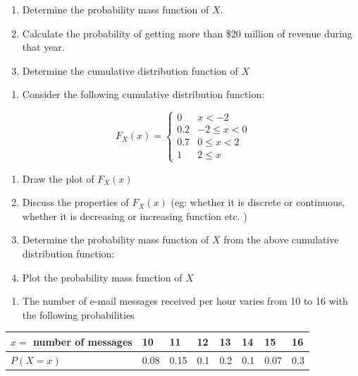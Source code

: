 \documentclass[]{book}
\providecommand{\tightlist}{%
  \setlength{\itemsep}{0pt}\setlength{\parskip}{0pt}}
\begin{document}
\begin{enumerate}
\def\labelenumi{(\alph{enumi})}
\tightlist
\item
  Determine the probability mass function of \(X\).
\item
  Calculate the probability of getting more than \$20 million of revenue during that year.\\
\item
  Determine the cumulative distribution function of \(X\)
\end{enumerate}

\begin{enumerate}
\def\labelenumi{\arabic{enumi}.}
\setcounter{enumi}{5}
\tightlist
\item
  Consider the following cumulative distribution function:
\end{enumerate}

\begin{equation}
F_X(x) =
\begin{cases} 
0 & x<-2\\
0.2 & -2 \leq x< 0\\
0.7 & 0\leq x<2\\
1 & 2 \leq x
\end{cases}
\end{equation}

\begin{enumerate}
\def\labelenumi{\alph{enumi})}
\tightlist
\item
  Draw the plot of \(F_X(x)\)
\item
  Discuss the properties of \(F_X(x)\) (eg: whether it is discrete or continuous, whether it is decreasing or increasing function etc. )
\item
  Determine the probability mass function of \(X\) from the above cumulative distribution function:
\item
  Plot the probability mass function of \(X\)
\end{enumerate}

\begin{enumerate}
\def\labelenumi{\arabic{enumi}.}
\setcounter{enumi}{6}
\tightlist
\item
  The number of e-mail messages received per hour varies from 10 to 16 with the following probabilities
\end{enumerate}

\begin{longtable}[]{@{}llllllll@{}}
\toprule
\(x =\) number of messages & 10 & 11 & 12 & 13 & 14 & 15 & 16\tabularnewline
\midrule
\endhead
\(P(X=x)\) & 0.08 & 0.15 & 0.1 & 0.2 & 0.1 & 0.07 & 0.3\tabularnewline
\bottomrule
\end{longtable}
\end{document}
